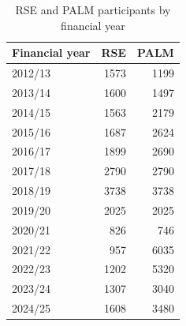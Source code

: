 \documentclass[9pt,a4paper,twocolumn,twoside]{tau-class/tau}
\begin{document}
\begin{table}[htbp]
\centering
\caption{RSE and PALM participants by financial year}
\label{tab:rse-palm}
\begin{tabular}{lrr}
\toprule
\textbf{Financial year} & \textbf{RSE} & \textbf{PALM} \\
\midrule
2012/13 & 1573 & 1199 \\
2013/14 & 1600 & 1497 \\
2014/15 & 1563 & 2179 \\
2015/16 & 1687 & 2624 \\
2016/17 & 1899 & 2690 \\
2017/18 & 2790 & 2790 \\
2018/19 & 3738 & 3738 \\
2019/20 & 2025 & 2025 \\
2020/21 &  826 &  746 \\
2021/22 &  957 & 6035 \\
2022/23 & 1202 &  5320 \\
2023/24 & 1307 & 3040 \\
2024/25 & 1608 & 3480 \\
\bottomrule
\end{tabular}

\end{table}




\end{document}
